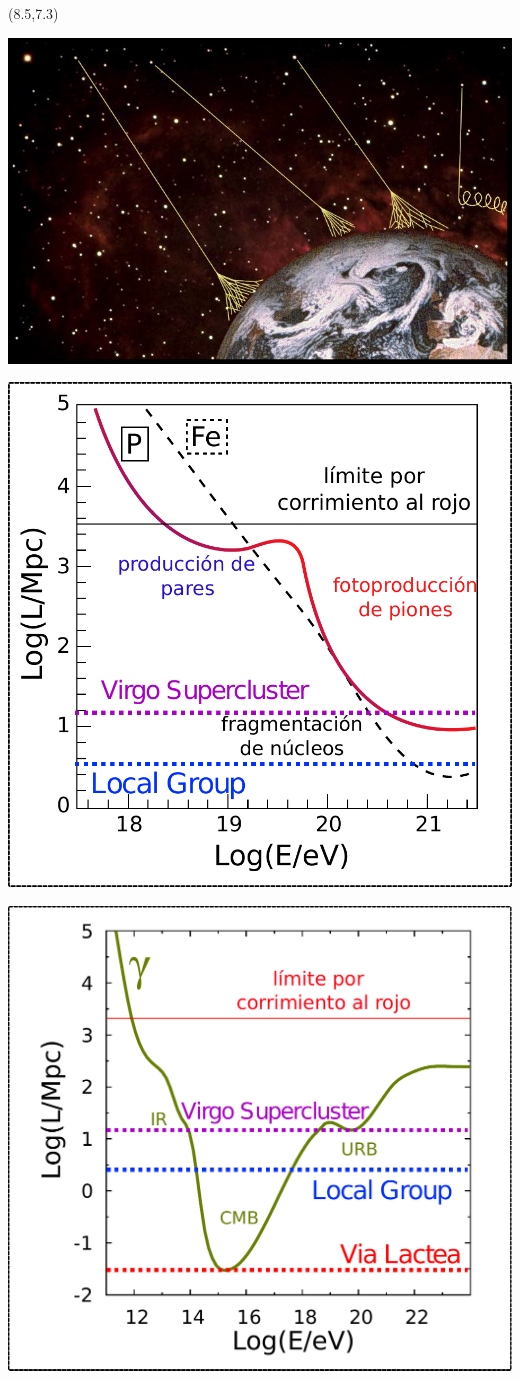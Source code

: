 \begin{frame}
 \begin{textblock}{7}(8.5,7.3)
   \begin{overprint}
    \vspace*{3.5mm}\centerline{\includegraphics[width=\textwidth]{fig/motivacion/out}}
    \centerline{\includegraphics[height=0.75\textwidth]{fig/motivacion/proton}}
    \centerline{\includegraphics[height=0.75\textwidth]{fig/motivacion/photon}}

\end{overprint}
\end{textblock}
\end{frame}
